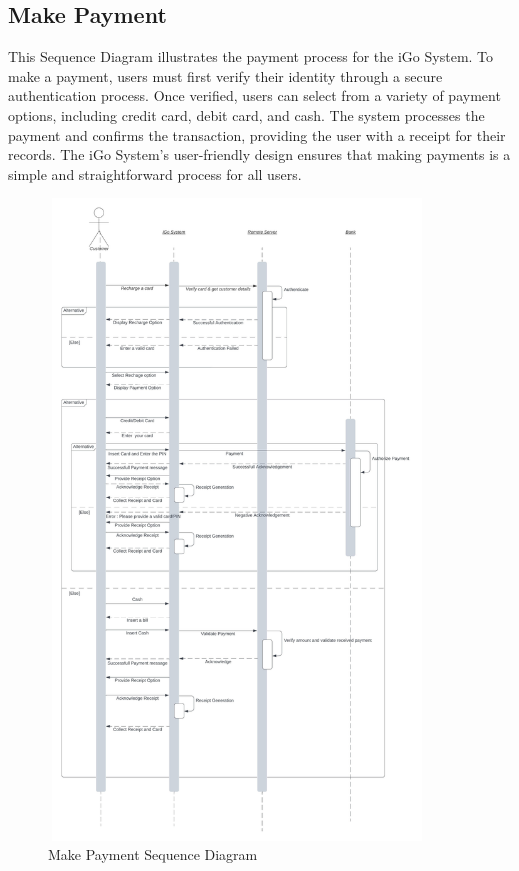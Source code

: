 \documentclass[a4paper, 11pt]{report}
\begin{document}
\subsection{Make Payment}
This Sequence Diagram illustrates the payment process for the iGo System. To make a payment, users must first verify their identity through a secure authentication process. Once verified, users can select from a variety of payment options, including credit card, debit card, and cash. The system processes the payment and confirms the transaction, providing the user with a receipt for their records. The iGo System's user-friendly design ensures that making payments is a simple and straightforward process for all users.
\begin{figure}[h]
    \renewcommand{\thefigure}{7.2.6}
    \centering
    \includegraphics[width=10cm,height=17cm]{MakePayment.jpeg}
    \caption{Make Payment Sequence Diagram}
\end{figure}
\end{document}
